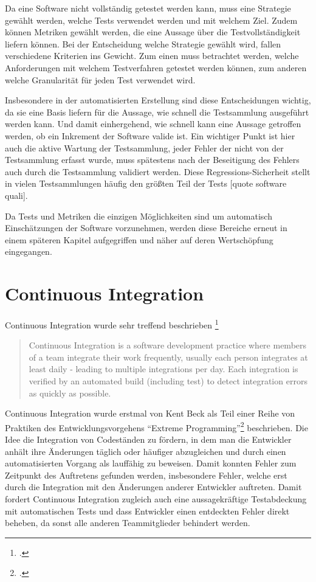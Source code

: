 Da eine Software nicht vollständig getestet werden kann, muss eine Strategie gewählt werden, welche Tests verwendet werden und mit welchem Ziel. Zudem können Metriken gewählt werden, die eine Aussage über die Testvollständigkeit liefern können. Bei der Entscheidung welche Strategie gewählt wird, fallen verschiedene Kriterien ins Gewicht. Zum einen muss betrachtet werden, welche Anforderungen mit welchem Testverfahren getestet werden können, zum anderen welche Granularität für jeden Test verwendet wird.

Insbesondere in der automatisierten Erstellung sind diese Entscheidungen wichtig, da sie eine Basis liefern für die Aussage, wie schnell die Testsammlung ausgeführt werden kann. Und damit einhergehend, wie schnell kann eine Aussage getroffen werden, ob ein Inkrement der Software valide ist. 
Ein wichtiger Punkt ist hier auch die aktive Wartung der Testsammlung, jeder Fehler der nicht von der Testsammlung erfasst wurde, muss spätestens nach der Beseitigung des Fehlers auch durch die Testsammlung validiert werden. Diese Regressions-Sicherheit stellt in vielen Testsammlungen häufig den größten Teil der Tests [quote software quali].

Da Tests und Metriken die einzigen Möglichkeiten sind um automatisch Einschätzungen der Software vorzunehmen, werden diese Bereiche erneut in einem späteren Kapitel aufgegriffen und näher auf deren Wertschöpfung eingegangen.

\section{Continuous Integration}

Continuous Integration wurde sehr treffend beschrieben \footcite{fowler2006}
\blockquote {Continuous Integration is a software development practice where members of a team integrate their work frequently, usually each person integrates at least daily - leading to multiple integrations per day. Each integration is verified by an automated build (including test) to detect integration errors as quickly as possible.}

Continuous Integration wurde erstmal von Kent Beck als Teil einer Reihe von Praktiken des Entwicklungsvorgehens ``Extreme Programming''\footcite{kent1999} beschrieben. Die Idee die Integration von Codeständen zu fördern, in dem man die Entwickler anhält ihre Änderungen täglich oder häufiger abzugleichen und durch einen automatisierten Vorgang als lauffähig zu beweisen. Damit konnten Fehler zum Zeitpunkt des Auftretens gefunden werden, insbesondere Fehler, welche erst durch die Integration mit den Änderungen anderer Entwickler auftreten. Damit fordert Continuous Integration zugleich auch eine aussagekräftige Testabdeckung mit automatischen Tests und dass Entwickler einen entdeckten Fehler direkt beheben, da sonst alle anderen Teammitglieder behindert werden.

